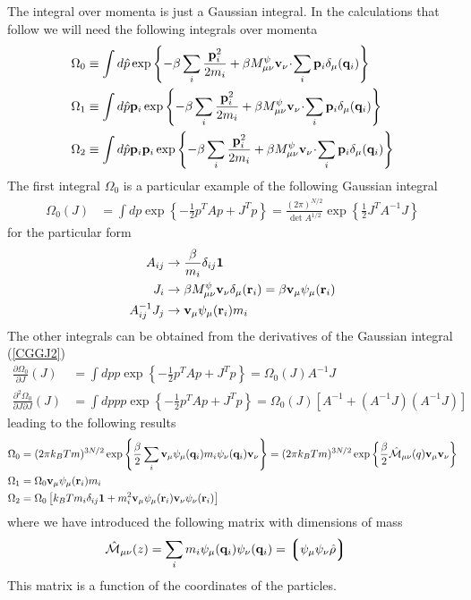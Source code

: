 \documentclass[b5paper,openright,11pt]{book}
\newcommand{\esc}{\!\cdot\!}
\newcommand{\llg}{\left\lgroup}
\newcommand{\rlg}{\right\rgroup}
\begin{document}
\begin{appendices}
The  integral  over  momenta  is  just a  Gaussian  integral.  In  the
calculations that  follow we  will need  the following  integrals over
momenta
\begin{align}
\Omega_0&\equiv  \int d\hat{p}
\exp\left\{-\beta\sum_i\frac{{\bf p}_i^2}{2m_i}+\beta M^\psi_{\mu\nu}{\bf v}_\nu\esc\sum_i{\bf p}_i\delta_\mu({\bf q}_i)\right\}
\nonumber\\
\Omega_1&\equiv\int d\hat{p} {\bf p}_i
\exp\left\{-\beta\sum_i\frac{{\bf p}_i^2}{2m_i}+\beta M^\psi_{\mu\nu}{\bf v}_\nu\esc\sum_i{\bf p}_i\delta_\mu({\bf q}_i)\right\}
\nonumber\\
\Omega_2&\equiv\int d\hat{p} {\bf p}_i{\bf p}_i
\exp\left\{-\beta\sum_i\frac{{\bf p}_i^2}{2m_i}+\beta M^\psi_{\mu\nu}{\bf v}_\nu\esc\sum_i{\bf p}_i\delta_\mu({\bf q}_i)\right\}
\end{align}
The first integral $\Omega_0$ is   a particular  example  of the  following
Gaussian integral
\begin{align}
  \Omega_0(J)&= \int dp \exp\left\{-\frac{1}{2}p^T Ap+J^Tp\right\}
=\frac{(2\pi)^{N/2}}{\det A^{1/2}}
\exp\left\{\frac{1}{2}J^TA^{-1}J\right\}
\label{CGGJ2}
\end{align}
for the particular form 
\begin{align}
  A_{ij}&\to \frac{\beta}{m_i}\delta_{ij}{\bf 1}
\nonumber\\
J_i&\to \beta M^\psi_{\mu\nu}{\bf v}_\nu\delta_\mu({\bf r}_i)=\beta {\bf v}_\mu\psi_\mu({\bf r}_i)
\nonumber\\
A_{ij}^{-1}J_j&\to {\bf v}_\mu\psi_\mu({\bf r}_i)m_i
\end{align}
The other integrals can  be  obtained  from  the
derivatives of the Gaussian integral (\ref{CGGJ2})
\begin{align}
\frac{\partial  \Omega_0}{\partial J}(J)
& = \int dp p \exp\left\{-\frac{1}{2}p^T Ap+J^Tp\right\}
=\Omega_0(J) A^{-1}J
\nonumber\\
\frac{\partial^2  \Omega_0}{\partial J\partial J}(J)
&= \int dp pp \exp\left\{-\frac{1}{2}p^T Ap+J^Tp\right\}
=\Omega_0(J)\left[A^{-1}+ (A^{-1}J) (A^{-1}J)\right]
\label{CGGJ3}
\end{align}
leading to the following results
\begin{align}
  \Omega_0 &=(2\pi k_BTm)^{3N/2}\exp\left\{\frac{\beta}{2}\sum_i{\bf v}_\mu\psi_\mu({\bf q}_i)m_i
\psi_\nu({\bf q}_i){\bf v}_\nu\right\}=
(2\pi k_BTm)^{3N/2}\exp\left\{\frac{\beta}{2}\hat{\cal M}_{\mu\nu}(q){\bf v}_\mu{\bf v}_\nu\right\}
\nonumber\\
  \Omega_1 &=\Omega_0  {\bf v}_\mu\psi_\mu({\bf r}_i)m_i
\nonumber\\
  \Omega_2 &=\Omega_0\left[k_BTm_i\delta_{ij}{\bf 1}+m_i^2{\bf v}_\mu\psi_\mu({\bf r}_i) {\bf v}_\nu\psi_\nu({\bf r}_i)\right]
\label{Omegas}
\end{align}
where we have introduced the following matrix with dimensions of mass
\begin{align}
  \hat{\cal M}_{\mu\nu}(z)&=\sum_im_i\psi_\mu({\bf q}_i)\psi_\nu({\bf q}_i)=\llg\psi_\mu\psi_\nu\hat{\rho}\rlg
\label{calM}
\end{align}
This matrix is a  function of  the coordinates  of the  particles.   


\end{appendices}
\end{document}
